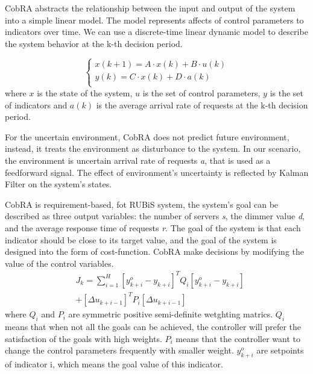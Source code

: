 \documentclass[sigconf]{acmart}
\begin{document}
CobRA abstracts the relationship between the input and output of the system into a simple linear model. The model represents affects of control parameters to indicators over time. We can use a discrete-time linear dynamic model to describe the system behavior at the k-th decision period.

\begin{equation}
\left\{
\begin{array}{rcl}
x(k+1)=A\cdot x(k)+B\cdot u(k)\\
y(k)=C\cdot x(k)+D\cdot a(k)\\
\end{array} \right.
\end{equation}
where $x$ is the state of the system, $u$ is the set of control parameters, $y$ is the set of indicators and $a(k)$ is the average arrival rate of requests at the k-th decision period.

For the uncertain environment, CobRA does not predict future environment, instead, it treats the environment as disturbance to the system. In our scenario, the environment is uncertain arrival rate of requests \textit{a}, that is used as a feedforward signal. The effect of environment's uncertainty is reflected by Kalman Filter on the system's states.

CobRA is requirement-based, fot RUBiS system, the system's goal can be described as three output variables: the number of servers \textit{s}, the dimmer value \textit{d}, and the average response time of requests \textit{r}.
The goal of the system is that each indicator should be close to its target value, and the goal of the system is designed into the form of cost-function. CobRA make decisions by modifying the value of the control variables.
\begin{equation}
\begin{aligned}
&J_{k}=\sum_{i=1}^H [y_{k+i}^o -y_{k+i}]^TQ_{i}[y_{k+i}^o -y_{k+i}] \\
&+[\Delta u_{k+i-1}]^T P_{i}[\Delta u_{k+i-1}]
\end{aligned}
\end{equation}
where $Q_{i}$ and $P_{i}$ are symmetric positive semi-definite wetghting matrics. $Q_i$ means that when not all the goals can be achieved, the controller will prefer the satisfaction of the goals with high weights. $P_i$ means that the controller want to change the control parameters frequently with smaller weight. $y_{k+i}^o$ are setpoints of indicator i, which means the goal value of this indicator. 
\end{document}
